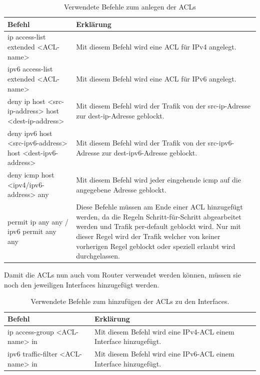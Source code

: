 \documentclass{article}
\begin{document}
\begin{table}[htbp]
    \centering
    \begin{tabularx}{\textwidth}{|X|X|}
        \toprule
        \textbf{Befehl} & \textbf{Erklärung} \\
        \midrule
        ip access-list extended <ACL-name> & Mit diesem Befehl wird eine ACL für IPv4 angelegt.\\
        \hline
        ipv6 access-list extended <ACL-name> & Mit diesem Befehl wird eine ACL für IPv6 angelegt.\\
        \hline
        deny ip host <src-ip-address> host <dest-ip-address> & Mit diesem Befehl wird der Trafik von der src-ip-Adresse zur dest-ip-Adresse geblockt.\\ 
        \hline
        deny ipv6 host <src-ipv6-address> host <dest-ipv6-address> & Mit diesem Befehl wird der Trafik von der src-ipv6-Adresse zur dest-ipv6-Adresse geblockt.\\
        \hline
        deny icmp host <ipv4/ipv6-address> any & Mit diesem Befehl wird jeder eingehende icmp auf die angegebene Adresse geblockt.\\
        \hline
        permit ip any any / ipv6 permit any any & Diese Befehle müssen am Ende einer ACL hinzugefügt werden, da die Regeln Schritt-für-Schritt abgearbeitet werden und Trafik per-default geblockt wird. Nur mit dieser Regel wird der Trafik welcher von keiner vorherigen Regel geblockt oder speziell erlaubt wird durchgelassen.\\ 
        \bottomrule
    \end{tabularx}
    \caption{Verwendete Befehle zum anlegen der ACLs}
    \label{tab:commands}
\end{table}

\noindent Damit die ACLs nun auch vom Router verwendet werden können, müssen sie noch den jeweiligen Interfaces hinzugefügt werden.\\

\begin{table}[htbp]
    \centering
    \begin{tabularx}{\textwidth}{|X|X|}
        \toprule
        \textbf{Befehl} & \textbf{Erklärung} \\
        \midrule
        ip access-group <ACL-name> in & Mit diesem Befehl wird eine IPv4-ACL einem Interface hinzugefügt.\\
        \hline
        ipv6 traffic-filter <ACL-name> in & Mit diesem Befehl wird eine IPv6-ACL einem Interface hinzugefügt.\\
        \bottomrule
    \end{tabularx}
    \caption{Verwendete Befehle zum hinzufügen der ACLs zu den Interfaces.}
    \label{tab:commands}
\end{table}
\end{document}
